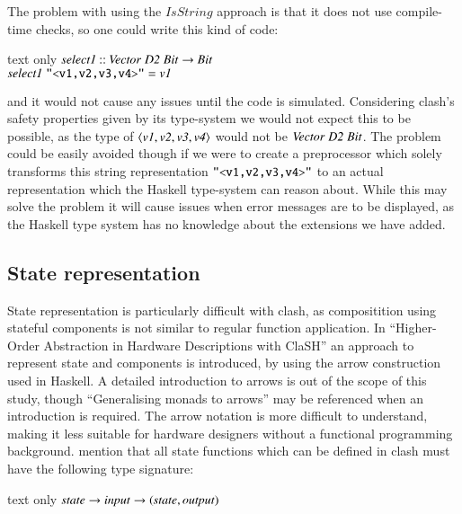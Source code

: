 The problem with using the $IsString$ approach is that it does not use compile-time checks, so one could write this kind of code:\\
\begin{changemargin}{1cm}{0cm}
\begin{expansionno}{text only}
\ensuremath{\Varid{select1}\mathbin{::}\Conid{Vector}\;\Conid{D2}\;\Conid{Bit}\to \Conid{Bit}}\\
\ensuremath{\Varid{select1}\;\text{\tt \char34 <v1,v2,v3,v4>\char34}\mathrel{=}\Varid{v1}}
\end{expansionno}
\end{changemargin}
and it would not cause any issues until the code is simulated.
Considering \gls{clash}'s safety properties given by its type-system we would not expect this to be possible, as the type of \ensuremath{\langle\Varid{v1},\Varid{v2},\Varid{v3},\Varid{v4}\rangle} would not be \ensuremath{\Conid{Vector}\;\Conid{D2}\;\Conid{Bit}}.
The problem could be easily avoided though if we were to create a preprocessor which solely transforms this string representation \ensuremath{\text{\tt \char34 <v1,v2,v3,v4>\char34}} to an actual representation which the Haskell type-system can reason about.
While this may solve the problem it will cause issues when error messages are to be displayed, as the Haskell type system has no knowledge about the extensions we have added.

\subsection{State representation}
State representation is particularly difficult with \gls{clash}, as compositition using stateful components is not similar to regular function application.
In ``Higher-Order Abstraction in Hardware Descriptions with ClaSH''\cite{gerards2011higher} an approach to represent state and components is introduced, by using the arrow construction used in Haskell.
A detailed introduction to arrows is out of the scope of this study, though ``Generalising monads to arrows''\cite{hughes2000generalising} may be referenced when an introduction is required.
The arrow notation is more difficult to understand, making it less suitable for hardware designers without a functional programming background.
\citeauthor{gerards2011higher} mention\cite{gerards2011higher} that all state functions which can be defined in \gls{clash} must have the following type signature:\\

\begin{changemargin}{1cm}{0cm}
\begin{expansionno}{text only}
\ensuremath{\Varid{state}\to \Varid{input}\to (\Varid{state},\Varid{output})}
\end{expansionno}
\end{changemargin}

